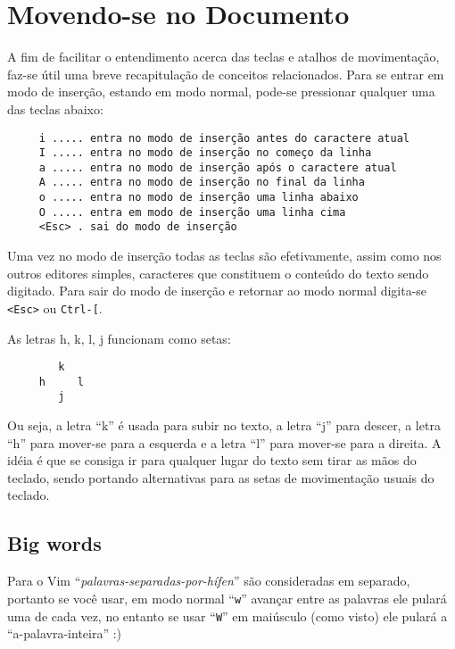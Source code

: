 \chapter{Movendo-se no Documento}\label{cha:Movendo-se no Documento}

A fim de facilitar o entendimento acerca das teclas e atalhos de movimentação,
faz-se útil uma breve recapitulação de conceitos relacionados. Para se entrar
em modo de inserção, estando em modo normal, pode-se pressionar qualquer uma
das teclas abaixo:

\begin{verbatim}
     i ..... entra no modo de inserção antes do caractere atual
     I ..... entra no modo de inserção no começo da linha
     a ..... entra no modo de inserção após o caractere atual
     A ..... entra no modo de inserção no final da linha
     o ..... entra no modo de inserção uma linha abaixo
     O ..... entra em modo de inserção uma linha cima
     <Esc> . sai do modo de inserção
\end{verbatim}

Uma vez no modo de inserção todas as teclas são efetivamente, assim como nos
outros editores simples, caracteres que constituem o conteúdo do texto sendo
digitado.  Para sair do modo de inserção e retornar ao modo normal digita-se
\verb+<Esc>+ ou \verb+Ctrl-[+.

As letras h, k, l, j funcionam como setas:

\begin{verbatim}
        k
     h     l
        j
\end{verbatim}

Ou seja, a letra ``k'' é usada para subir no texto, a letra ``j'' para descer,
a letra ``h'' para mover-se para a esquerda e a letra ``l'' para mover-se para
a direita. A idéia é que se consiga ir para qualquer lugar do texto sem tirar
as mãos do teclado, sendo portando alternativas para as setas de movimentação
usuais do teclado.

\section{Big words}
\label{Big words}

Para o Vim ``{\em{palavras-separadas-por-hífen}}'' são consideradas em separado, portanto se você usar,
em modo normal ``\verb+w+'' avançar entre as palavras ele pulará uma de
cada vez, no entanto se usar ``\verb+W+''
em maiúsculo (como visto) ele pulará a ``a-palavra-inteira'' :)

